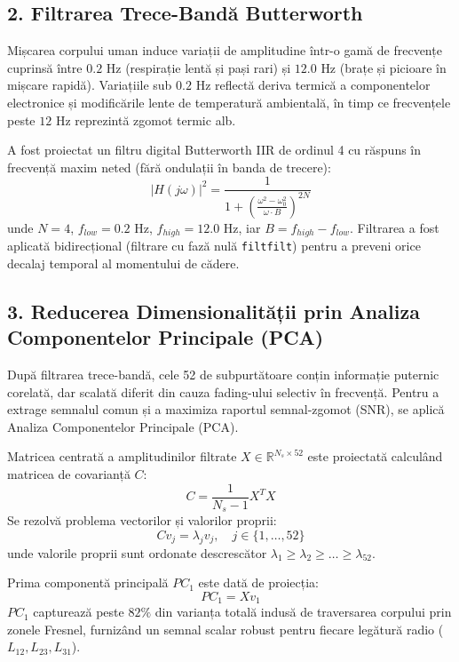 \subsection{2. Filtrarea Trece-Bandă Butterworth}
Mișcarea corpului uman induce variații de amplitudine într-o gamă de frecvențe cuprinsă între $0.2\text{ Hz}$ (respirație lentă și pași rari) și $12.0\text{ Hz}$ (brațe și picioare în mișcare rapidă). Variațiile sub $0.2\text{ Hz}$ reflectă deriva termică a componentelor electronice și modificările lente de temperatură ambientală, în timp ce frecvențele peste $12\text{ Hz}$ reprezintă zgomot termic alb.

A fost proiectat un filtru digital Butterworth IIR de ordinul 4 cu răspuns în frecvență maxim neted (fără ondulații în banda de trecere):
\begin{equation}
    |H(j\omega)|^2 = \frac{1}{1 + \left(\frac{\omega^2 - \omega_0^2}{\omega \cdot B}\right)^{2N}}
\end{equation}
unde $N = 4$, $f_{low} = 0.2\text{ Hz}$, $f_{high} = 12.0\text{ Hz}$, iar $B = f_{high} - f_{low}$. Filtrarea a fost aplicată bidirecțional (filtrare cu fază nulă \texttt{filtfilt}) pentru a preveni orice decalaj temporal al momentului de cădere.

\subsection{3. Reducerea Dimensionalității prin Analiza Componentelor Principale (PCA)}
După filtrarea trece-bandă, cele 52 de subpurtătoare conțin informație puternic corelată, dar scalată diferit din cauza fading-ului selectiv în frecvență. Pentru a extrage semnalul comun și a maximiza raportul semnal-zgomot (SNR), se aplică Analiza Componentelor Principale (PCA).

Matricea centrată a amplitudinilor filtrate $X \in \mathbb{R}^{N_s \times 52}$ este proiectată calculând matricea de covarianță $C$:
\begin{equation}
    C = \frac{1}{N_s - 1} X^T X
\end{equation}
Se rezolvă problema vectorilor și valorilor proprii:
\begin{equation}
    C v_j = \lambda_j v_j, \quad j \in \{1, \dots, 52\}
\end{equation}
unde valorile proprii sunt ordonate descrescător $\lambda_1 \ge \lambda_2 \ge \dots \ge \lambda_{52}$.

Prima componentă principală $PC_1$ este dată de proiecția:
\begin{equation}
    PC_1 = X v_1
\end{equation}
$PC_1$ capturează peste $82\%$ din varianța totală indusă de traversarea corpului prin zonele Fresnel, furnizând un semnal scalar robust pentru fiecare legătură radio ($L_{12}, L_{23}, L_{31}$).

